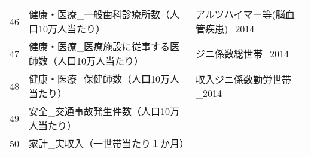 \begin{table}[H]
\begin{adjustbox}{width=1\textwidth}
\begin{tabular}{rll}
  46 & 健康・医療\_一般歯科診療所数（人口10万人当たり） & アルツハイマー等(脳血管疾患)\_2014 \\
  47 & 健康・医療\_医療施設に従事する医師数（人口10万人当たり） & ジニ係数総世帯\_2014 \\
  48 & 健康・医療\_保健師数（人口10万人当たり） & 収入ジニ係数勤労世帯\_2014 \\
  49 & 安全\_交通事故発生件数（人口10万人当たり） &  \\
  50 & 家計\_実収入（一世帯当たり１か月） &  \\
   \hline
\end{tabular}
\end{adjustbox}

\endgroup
\end{table}

